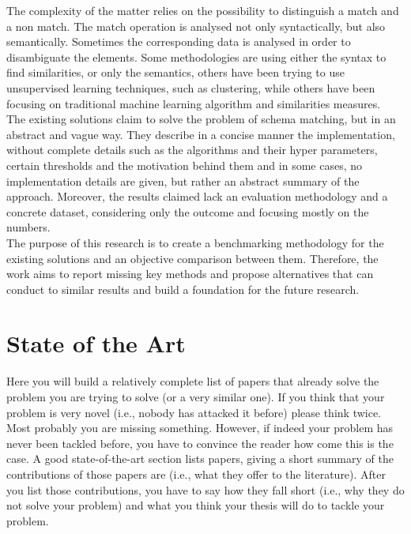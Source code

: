 \documentclass[a4paper]{article}
\begin{document}
The complexity of the matter relies on the possibility to distinguish a match and a non match. The match operation is analysed not only syntactically, but also semantically. Sometimes the corresponding data is analysed in order to disambiguate the elements. Some methodologies are using either the syntax to find similarities, or only the semantics, others have been trying to use unsupervised learning techniques, such as clustering, while others have been focusing on traditional machine learning algorithm and similarities measures. \\

The existing solutions claim to solve the problem of schema matching, but in an abstract and vague way. They describe in a concise manner the implementation, without complete details such as the algorithms and their hyper parameters, certain thresholds and the motivation behind them and in some cases, no implementation details are given, but rather an abstract summary of the approach. Moreover, the results claimed lack an evaluation methodology and a concrete dataset, considering only the outcome and focusing mostly on the numbers. \\

The purpose of this research is to create a benchmarking methodology for the existing solutions and an objective comparison between them. Therefore, the work aims to report missing key methods and propose alternatives that can conduct to similar results and build a foundation for the future research.  



\section{State of the Art}
Here you will build a relatively complete list of papers that already solve the problem you are trying to solve (or a very similar one). If you think that your problem is very novel (i.e., nobody has attacked it before) please think twice. Most probably you are missing something. However, if indeed your problem has never been tackled before, you have to convince the reader how come this is the case. A good state-of-the-art section lists papers, giving a short summary of the contributions of those papers are (i.e., what they offer to the literature). After you list those contributions, you have to say how they fall short (i.e., why they do not solve your problem) and what you think your thesis will do to tackle your problem. \\
\end{document}
